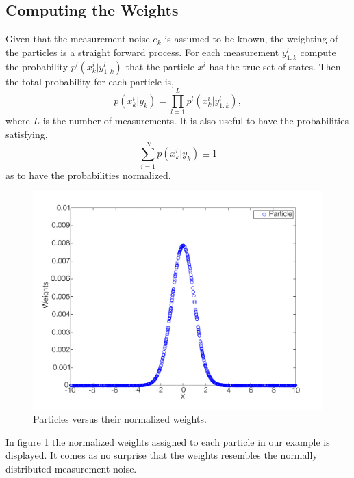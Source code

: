 \documentclass{LTHthesis}
\begin{document}
\subsection{Computing the Weights}
%
Given that the measurement noise $e_k$ is assumed to be known, the weighting of the particles is a straight forward process. For each measurement $y^l_{1:k}$ compute the probability $p^l(x^i_k|y^l_{1:k})$ that the particle $x^i$ has the true set of states. Then the total probability for each particle is,
%
\begin{equation}
p(x^i_k|y_k)=\prod_{l=1}^{L}p^l(x^i_k|y^l_{1:k}), 
\end{equation}
%
where $L$ is the number of measurements. It is also useful to have the probabilities satisfying,
%
\begin{equation}
\sum^{N}_{i=1}p(x^i_k|y_k)\equiv 1
\end{equation}
%
as to have the probabilities normalized.
%
\begin{figure}[!hbt]

\includegraphics[width=1\textwidth ]{images/PF/particle_weights}
\caption{Particles versus their normalized weights.}\label{particle_weights}
\end{figure}

In figure \ref{particle_weights} the normalized weights assigned to each particle in our example is displayed. It comes as no surprise that the weights resembles the normally distributed measurement noise. 
%
\end{document}
